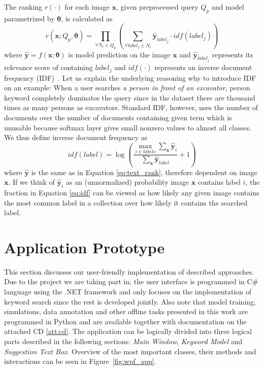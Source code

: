 The ranking $r(\cdot)$ for each image $\bm{x}$, given preprocessed query $Q_p$ and model parametrized by $\bm{\theta}$, is calculated as 
\begin{equation}
r\left(\bm{x}; Q_p, \bm{\theta}\right)=\prod\limits_{\forall N_i \in Q_p}\left(
	\sum\limits_{\forall label_j\in N_i} \bm{\hat{y}}_{label_j}\cdot idf\left(label_j\right)
\right)\label{eq:text_rank}
\end{equation}
where $\bm{\hat{y}}=f\left(\bm{x}; \bm{\theta}\right)$  is model prediction on the image $\bm{x}$ and $\bm{\hat{y}}_{label_j}$ represents its relevance score of containing $label_j$ and $idf(\cdot)$ represents an inverse document frequency (IDF)~\cite{baeza1999modern}. Let us explain the underlying reasoning why to introduce IDF on an example: When a user searches \textit{a person in front of an excavator}, person keyword completely dominates the query since in the dataset there are thousand times as many persons as excavators. Standard IDF, however, uses the number of documents over the number of documents containing given term which is unusable because softmax layer gives small nonzero values to almost all classes. We thus define inverse document frequency as
\begin{equation}
idf(label) = \log\left(
\frac{
\max\limits_{i\in labels} \sum_{\bm{x}}\hat{\bm{y}}_{i}
}{
\sum_{\bm{x}}\hat{\bm{y}}_{label}
} + 1\right)\label{eq:idf}
\end{equation}
where $\hat{\bm{y}}$ is the same as in Equation \ref{eq:text_rank}, therefore dependent on image $\bm{x}$. If we think of $\hat{\bm{y}}_i$ as an (unnormalized) probability image $\bm{x}$ contains label $i$, the fraction in Equation \ref{eq:idf} can be viewed as how likely any given image contains the most common label in a collection over how likely it contains the searched label.

\section{Application Prototype}\label{chap:application_prototype}
This section discusses our user-friendly implementation of described approaches. Due to the project we are taking part in, the user interface is programmed in C\# language using the .NET framework and only focuses on the implementation of keyword search since the rest is developed jointly. Also note that model training, simulations, data annotation and other offline tasks presented in this work are programmed in Python and are available together with documentation on the attached CD \ref{att:cd}. The application can be logically divided into three logical parts described in the following sections: \textit{Main Window}, \textit{Keyword Model} and \textit{Suggestion Text Box}. Overview of the most important classes, their methods and interactions can be seen in Figure~\ref{fig:wpf_app}.

